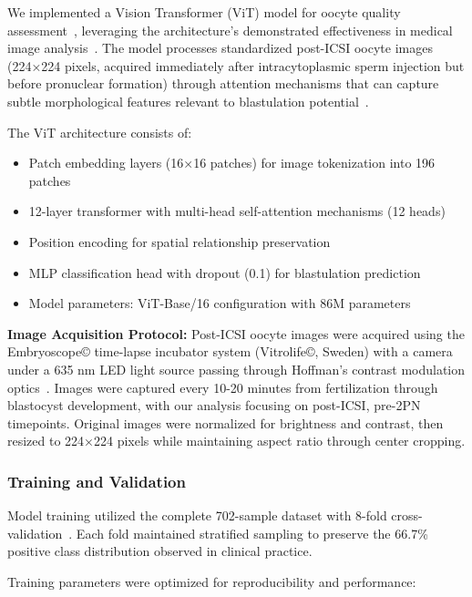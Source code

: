 We implemented a Vision Transformer (ViT) model for oocyte quality assessment~\cite{dosovitskiy2021image}, leveraging the architecture's demonstrated effectiveness in medical image analysis~\cite{alhammuri2023vision}. The model processes standardized post-ICSI oocyte images (224×224 pixels, acquired immediately after intracytoplasmic sperm injection but before pronuclear formation) through attention mechanisms that can capture subtle morphological features relevant to blastulation potential~\cite{zhang2021machine}.

The ViT architecture consists of:
\begin{itemize}
\item Patch embedding layers (16×16 patches) for image tokenization into 196 patches
\item 12-layer transformer with multi-head self-attention mechanisms (12 heads)
\item Position encoding for spatial relationship preservation
\item MLP classification head with dropout (0.1) for blastulation prediction
\item Model parameters: ViT-Base/16 configuration with 86M parameters
\end{itemize}

\textbf{Image Acquisition Protocol:} Post-ICSI oocyte images were acquired using the Embryoscope© time-lapse incubator system (Vitrolife©, Sweden) with a camera under a 635 nm LED light source passing through Hoffman's contrast modulation optics~\cite{gomez2022timelapse}. Images were captured every 10-20 minutes from fertilization through blastocyst development, with our analysis focusing on post-ICSI, pre-2PN timepoints. Original images were normalized for brightness and contrast, then resized to 224×224 pixels while maintaining aspect ratio through center cropping.

\subsubsection{Training and Validation}

Model training utilized the complete 702-sample dataset with 8-fold cross-validation~\cite{varoquaux2022machine}. Each fold maintained stratified sampling to preserve the 66.7\% positive class distribution observed in clinical practice.

Training parameters were optimized for reproducibility and performance:


